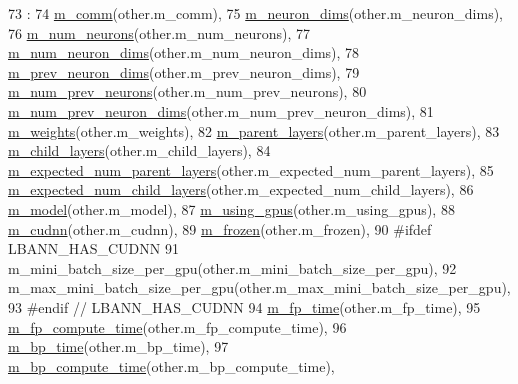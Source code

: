 \begin{DoxyCode}
73                                :
74   \hyperlink{classlbann_1_1Layer_a5de05c52f22e0bbd7c703bec3ad4dbf2}{m\_comm}(other.m\_comm),
75   \hyperlink{classlbann_1_1Layer_abb34bb8031f57a483e2e327a5f229f48}{m\_neuron\_dims}(other.m\_neuron\_dims),
76   \hyperlink{classlbann_1_1Layer_a6b5ebc8a7d9329d8a773ed787e7b41d8}{m\_num\_neurons}(other.m\_num\_neurons),
77   \hyperlink{classlbann_1_1Layer_adfd6178d21498c9095cd947ae1eb2d6a}{m\_num\_neuron\_dims}(other.m\_num\_neuron\_dims),
78   \hyperlink{classlbann_1_1Layer_ae204d1a2a79606eaa117273857ff62a3}{m\_prev\_neuron\_dims}(other.m\_prev\_neuron\_dims),
79   \hyperlink{classlbann_1_1Layer_ac7b30f4e28d58204bfcbb76886f9136d}{m\_num\_prev\_neurons}(other.m\_num\_prev\_neurons),
80   \hyperlink{classlbann_1_1Layer_adc052afb38f170e839db00d3c8151d1e}{m\_num\_prev\_neuron\_dims}(other.m\_num\_prev\_neuron\_dims),
81   \hyperlink{classlbann_1_1Layer_a7954e30fbf9100a6ba4b56d02767a469}{m\_weights}(other.m\_weights),
82   \hyperlink{classlbann_1_1Layer_a3fa7c6cf1a22bb14ab0e85e3dc6027c5}{m\_parent\_layers}(other.m\_parent\_layers),
83   \hyperlink{classlbann_1_1Layer_ae348c0d2b4d05f74d809d09debb633c0}{m\_child\_layers}(other.m\_child\_layers),
84   \hyperlink{classlbann_1_1Layer_a841b96b25555247f52921c7f13ae1dfa}{m\_expected\_num\_parent\_layers}(other.m\_expected\_num\_parent\_layers),
85   \hyperlink{classlbann_1_1Layer_ac08f133dddd150319650e220ab9a523a}{m\_expected\_num\_child\_layers}(other.m\_expected\_num\_child\_layers),
86   \hyperlink{classlbann_1_1Layer_a3d9315e99574166f2f33e37b572021d2}{m\_model}(other.m\_model),
87   \hyperlink{classlbann_1_1Layer_af7881cb5eff5207c15fa835d65462e8f}{m\_using\_gpus}(other.m\_using\_gpus),
88   \hyperlink{classlbann_1_1Layer_a08dbb94239e3b8c96329786c57c72e21}{m\_cudnn}(other.m\_cudnn),
89   \hyperlink{classlbann_1_1Layer_afdc60df9731a3ecdeeeb8175fa483676}{m\_frozen}(other.m\_frozen),
90 \textcolor{preprocessor}{#ifdef LBANN\_HAS\_CUDNN}
91   m\_mini\_batch\_size\_per\_gpu(other.m\_mini\_batch\_size\_per\_gpu),
92   m\_max\_mini\_batch\_size\_per\_gpu(other.m\_max\_mini\_batch\_size\_per\_gpu),
93 \textcolor{preprocessor}{#endif // LBANN\_HAS\_CUDNN}
94   \hyperlink{classlbann_1_1Layer_ab1bd9ab0a6f9e554f4dc936d8316028e}{m\_fp\_time}(other.m\_fp\_time),
95   \hyperlink{classlbann_1_1Layer_aa4e439c1d6a656e709dc4736c9380476}{m\_fp\_compute\_time}(other.m\_fp\_compute\_time),
96   \hyperlink{classlbann_1_1Layer_aa60fc41627bcaa9c345775bf5737bb45}{m\_bp\_time}(other.m\_bp\_time),
97   \hyperlink{classlbann_1_1Layer_ae28626457a58943b25e7a2920fc271f0}{m\_bp\_compute\_time}(other.m\_bp\_compute\_time),

\end{DoxyCode}
